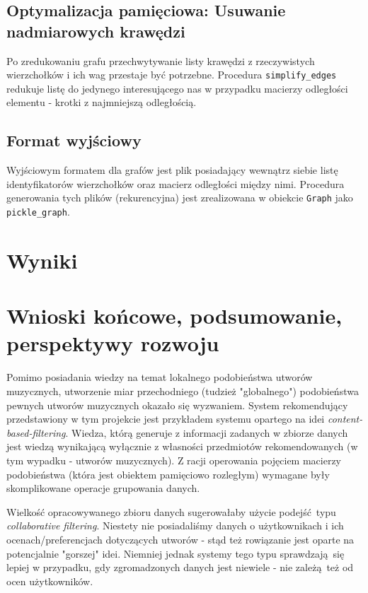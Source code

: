 \documentclass[a4paper,10pt]{article}
\begin{document}
\subsection{Optymalizacja pamięciowa: Usuwanie nadmiarowych krawędzi}

Po zredukowaniu grafu przechwytywanie listy krawędzi z rzeczywistych wierzchołków i ich wag przestaje być potrzebne. Procedura \texttt{simplify\_edges} redukuje listę do jedynego interesującego nas w przypadku macierzy odległości elementu - krotki z najmniejszą odległością.

\subsection{Format wyjściowy}

Wyjściowym formatem dla grafów jest plik posiadający wewnątrz siebie listę identyfikatorów wierzchołków oraz macierz odległości między nimi. Procedura generowania tych plików (rekurencyjna) jest zrealizowana w obiekcie \texttt{Graph} jako \texttt{pickle\_graph}.

\section{Wyniki}
\section{Wnioski końcowe, podsumowanie, perspektywy rozwoju}

Pomimo posiadania wiedzy na temat lokalnego podobieństwa utworów muzycznych, utworzenie miar przechodniego (tudzież "globalnego") podobieństwa pewnych utworów muzycznych okazało się wyzwaniem. System rekomendujący przedstawiony w tym projekcie jest przykładem systemu opartego na idei \textit{content-based-filtering}. Wiedza, którą generuje z informacji zadanych w zbiorze danych jest wiedzą wynikającą wyłącznie z własności przedmiotów rekomendowanych (w tym wypadku - utworów muzycznych). Z racji operowania pojęciem macierzy podobieństwa (która jest obiektem pamięciowo rozległym) wymagane były skomplikowane operacje grupowania danych.

Wielkość opracowywanego zbioru danych sugerowałaby użycie podejść typu \textit{collaborative filtering}. Niestety nie posiadaliśmy danych o użytkownikach i ich ocenach/preferencjach dotyczących utworów - stąd też rowiązanie jest oparte na potencjalnie "gorszej" idei. Niemniej jednak systemy tego typu sprawdzają się lepiej w przypadku, gdy zgromadzonych danych jest niewiele - nie zależą też od ocen użytkowników.
\end{document}
